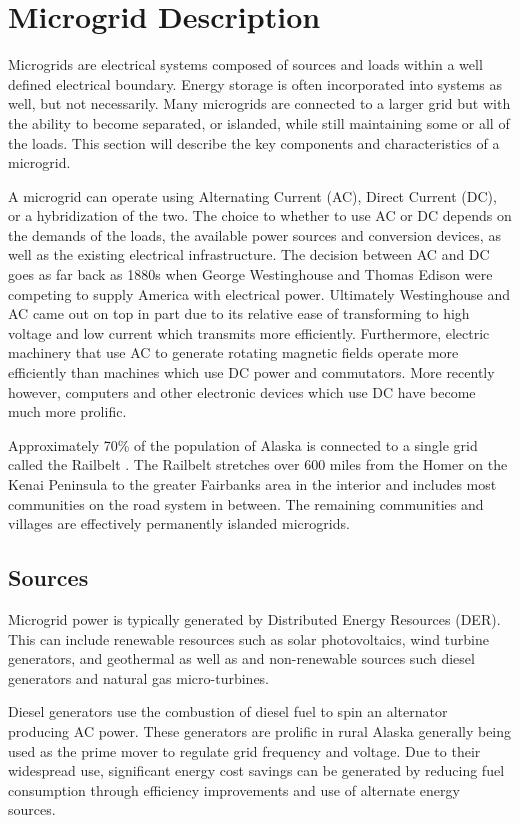 \section{Microgrid Description}
Microgrids are electrical systems composed of sources and loads within a well defined electrical boundary. Energy storage is often incorporated into systems as well, but not necessarily. Many microgrids are connected to a larger grid but with the ability to become separated, or islanded, while still maintaining some or all of the loads. This section will describe the key components and characteristics of a microgrid.

A microgrid can operate using Alternating Current (AC), Direct Current (DC), or a hybridization of the two. The choice to whether to use AC or DC depends on the demands of the loads, the available power sources and conversion devices, as well as the existing electrical infrastructure. The decision between AC and DC goes as far back as 1880s when George Westinghouse and Thomas Edison were competing to supply America with electrical power. Ultimately Westinghouse and AC came out on top in part due to its relative ease of transforming to high voltage and low current which transmits more efficiently. Furthermore, electric machinery that use AC to generate rotating magnetic fields operate more efficiently than machines which use DC power and commutators. More recently however, computers and other electronic devices which use DC have become much more prolific.  

Approximately 70\% of the population of Alaska is connected to a single grid called the Railbelt \cite{railbelt}. The Railbelt stretches over 600 miles from the Homer on the Kenai Peninsula to the greater Fairbanks area in the interior and includes most communities on the road system in between. The remaining communities and villages are effectively permanently islanded microgrids. 

\subsection{Sources}
Microgrid power is typically generated by Distributed Energy Resources (DER). This can include renewable resources such as solar photovoltaics, wind turbine generators, and geothermal as well as and non-renewable sources such diesel generators and natural gas micro-turbines. 

Diesel generators use the combustion of diesel fuel to spin an alternator producing AC power. These generators are prolific in rural Alaska generally being used as the prime mover to regulate grid frequency and voltage. 
Due to their widespread use, significant energy cost savings can be generated by reducing fuel consumption through efficiency improvements and use of alternate energy sources.

